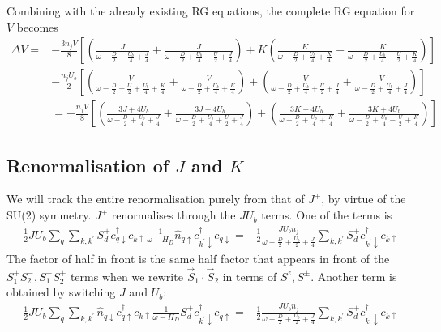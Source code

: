 \documentclass{report}
\numberwithin{equation}{section}
\begin{document}
\begin{appendices}
Combining with the already existing RG equations, the complete RG equation for \(V\) becomes
\begin{equation}\begin{aligned}
	\Delta V =& -\frac{3n_j V}{8}\left[\left(\frac{J}{\omega - \frac{D}{2} + \frac{U_b}{4} + \frac{J}{4}} + \frac{J}{\omega - \frac{D}{2} + \frac{U_b}{4} + \frac{U}{2} + \frac{J}{4}}\right) + K \left(\frac{K}{\omega - \frac{D}{2} + \frac{U_b}{4} + \frac{K}{4}} + \frac{K}{\omega - \frac{D}{2} + \frac{U_b}{4} - \frac{U}{2} + \frac{K}{4}}\right)\right]\\
		 &-\frac{n_jU_b}{2}\left[\left(\frac{V}{\omega - \frac{D}{2} - \frac{U}{2} + \frac{U_b}{4} + \frac{K}{4}} + \frac{V}{\omega - \frac{D}{2} + \frac{U_b}{4} + \frac{K}{4}}\right) + \left(\frac{V}{\omega - \frac{D}{2} + \frac{U_b}{4} + \frac{U}{2} + \frac{J}{4}} + \frac{V}{\omega - \frac{D}{2} + \frac{U_b}{4} + \frac{J}{4}}\right)\right]\\
		 &=-\frac{n_j V}{8}\left[\left(\frac{3J + 4U_b}{\omega - \frac{D}{2} + \frac{U_b}{4} + \frac{J}{4}} + \frac{3J + 4U_b}{\omega - \frac{D}{2} + \frac{U_b}{4} + \frac{U}{2} + \frac{J}{4}}\right) + \left(\frac{3K + 4U_b}{\omega - \frac{D}{2} + \frac{U_b}{4} + \frac{K}{4}} + \frac{3K + 4U_b}{\omega - \frac{D}{2} + \frac{U_b}{4} - \frac{U}{2} + \frac{K}{4}}\right)\right]
\end{aligned}\end{equation}

\subsection{Renormalisation of \(J\) and \(K\)}
We will track the entire renormalisation purely from that of \(J^+\), by virtue of the SU(2) symmetry. \(J^+\) renormalises through the \(J U_b\) terms. One of the terms is
\begin{equation}\begin{aligned}
	\frac{1}{2} J U_b \sum_{q} \sum_{k,k^\prime} S_d^+ c^\dagger_{q \downarrow} c_{k \uparrow} \frac{1}{\omega - H_D} \hat n_{q \uparrow} c^\dagger_{k^\prime \downarrow}c_{q \downarrow} = -\frac{1}{2}\frac{J U_b n_j}{\omega - \frac{D}{2} + \frac{U_b}{2} + \frac{J}{4}} \sum_{k,k^\prime} S_d^+ c^\dagger_{k^\prime \downarrow} c_{k \uparrow}
\end{aligned}\end{equation}
The factor of half in front is the same half factor that appears in front of the \(S_1^+ S_2^-, S_1^-S_2^+\) terms when we rewrite \(\vec{S}_1\cdot\vec{S}_2\) in terms of \(S^z, S^\pm\). Another term is obtained by switching \(J\) and \(U_b\):
\begin{equation}\begin{aligned}
	\frac{1}{2} J U_b \sum_{q} \sum_{k,k^\prime} \hat n_{q \downarrow} c^\dagger_{q \uparrow} c_{k \uparrow} \frac{1}{\omega - H_D}S_d^+ c^\dagger_{k^\prime \downarrow} c_{q \uparrow} = -\frac{1}{2}\frac{J U_b n_j}{\omega - \frac{D}{2} + \frac{U_b}{2} + \frac{J}{4}} \sum_{k,k^\prime} S_d^+ c^\dagger_{k^\prime \downarrow} c_{k \uparrow}
\end{aligned}\end{equation}


\end{appendices}
\end{document}
